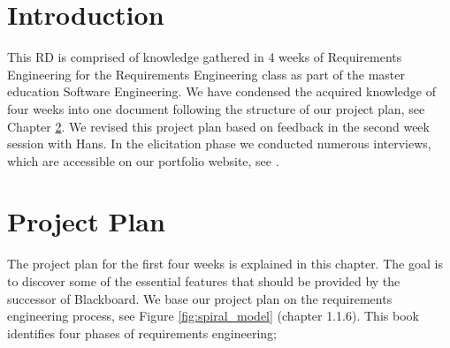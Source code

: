 

\chapter{Introduction}
This RD is comprised of knowledge gathered in 4 weeks of Requirements Engineering for the Requirements Engineering class as part of the master education Software Engineering. We have condensed the acquired knowledge of four weeks into one document following the structure of our project plan, see Chapter \ref{pp}. We revised this project plan based on feedback in the second week session with Hans. In the elicitation phase we conducted numerous interviews, which are accessible on our portfolio website, see .

\chapter{Project Plan}
\label{pp}
The project plan for the first four weeks is explained in this chapter. The goal is to discover some of the essential features that should be provided by the successor of Blackboard. We base our project plan on the requirements engineering process, see Figure \ref{fig:spiral_model} \cite{RE_book} (chapter 1.1.6). This book identifies four phases of requirements engineering; 

